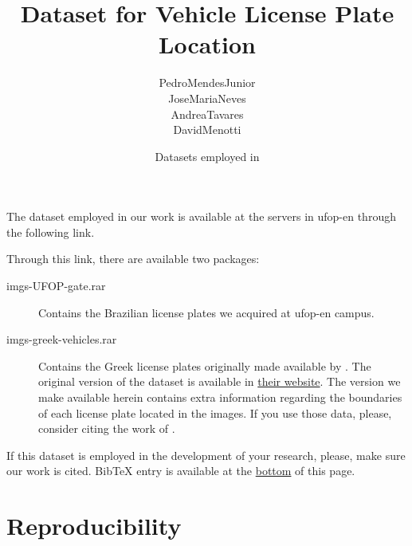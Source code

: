 

% 

\renewcommand\highlightauthorname[1]{#1}

\title{Dataset for Vehicle License Plate Location}
\author{\gls{PedroMendesJunior}\\%
  \gls{JoseMariaNeves}\\%
  \gls{AndreaTavares}\\%
  \gls{DavidMenotti}\\%
}
\date{Datasets employed in }



\maketitle

The dataset employed in our work  is available at the servers in \gls{ufop-en} through the following link.

\begin{center}
\end{center}

Through this link, there are available two packages:

\begin{description}
\item[imgs-UFOP-gate.rar]
  Contains the Brazilian license plates we acquired at \gls{ufop-en} campus.
\item[imgs-greek-vehicles.rar]
  Contains the Greek license plates originally made available by .
  The original version of the dataset is available in \href{http://www.medialab.ntua.gr/research/LPRdatabase.html}{their website}.
  The version we make available herein contains extra information regarding the boundaries of each license plate located in the images.
  If you use those data, please, consider citing the work of .
\end{description}

If this dataset is employed in the development of your research, please, make sure our work  is cited.
BibTeX entry is available at the \hyperref[ref:MendesJunior2011]{bottom} of this page.

\section*{Reproducibility}
\label{sec:reproducibility}

